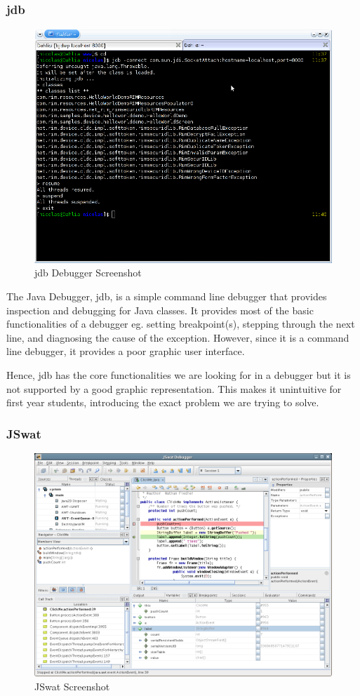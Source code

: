 \documentclass[11pt, a4paper]{article}
\begin{document}
\subsubsection{jdb}
\begin{figure}[h!]
\centering
\includegraphics[width=125mm]{jdb.png}
\caption{jdb Debugger Screenshot}
\end{figure}

The Java Debugger, jdb, is a simple command line debugger that provides inspection and debugging for Java classes.
It provides most of the basic functionalities of a debugger eg. setting breakpoint(s), stepping through the next line, and diagnosing the cause of the exception.
However, since it is a command line debugger, it provides a poor graphic user interface.

Hence, jdb has the core functionalities we are looking for in a debugger but it is not supported by a good graphic representation. This makes it unintuitive for first year students, introducing the exact problem we are trying to solve.
\subsubsection{JSwat}
\begin{figure}[h!]
\centering
\includegraphics[width=125mm]{jswat.png}
\caption{JSwat Screenshot}
\end{figure}
\end{document}
